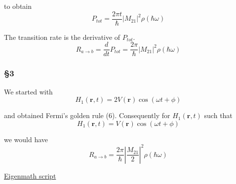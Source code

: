 to obtain
\begin{equation*}
P_{tot}=\frac{2\pi t}{\hbar}|M_{21}|^2\rho(\hbar\omega)
\end{equation*}

The transition rate is the derivative of $P_{tot}$.
\begin{equation*}
R_{a\rightarrow b}
=\frac{d}{dt}P_{tot}=\frac{2\pi}{\hbar}|M_{21}|^2\rho(\hbar\omega)
\tag{6}
\end{equation*}

\subsubsection*{\S3}

We started with
\begin{equation*}
H_1(\mathbf r,t)=2V(\mathbf r)\cos(\omega t+\phi)
\end{equation*}

and obtained Fermi's golden rule (6).
Consequently for $H_1(\mathbf r,t)$ such that
\begin{equation*}
H_1(\mathbf r,t)=V(\mathbf r)\cos(\omega t+\phi)
\end{equation*}

we would have
\begin{equation*}
R_{a\rightarrow b}=\frac{2\pi}{\hbar}\left|\frac{M_{21}}{2}\right|^2\rho(\hbar\omega)
\end{equation*}

\href{https://georgeweigt.github.io/examples/fermi-golden-rule-demo.html}{Eigenmath script}


